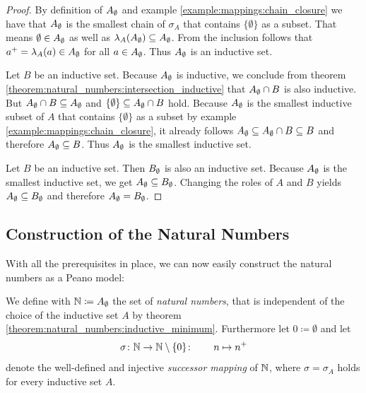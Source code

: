 \begin{proof}
     By definition of ${A}_\emptyset$ and example \ref{example:mappings:chain_closure} we have that ${A}_\emptyset$ is the smallest chain of $\sigma_A$ that contains $\{\emptyset\}$ as a subset. That means $\emptyset\in{A}_\emptyset$ as well as $\lambda_A({A}_\emptyset)\subseteq{A}_\emptyset$. From the inclusion follows that $a^+=\lambda_A(a)\in {A}_\emptyset$ for all $a\in {A}_\emptyset$. Thus ${A}_\emptyset$ is an inductive set.

     Let $B$ be an inductive set. Because ${A}_\emptyset$ is inductive, we conclude from theorem \ref{theorem:natural_numbers:intersection_inductive} that ${A}_\emptyset\cap B$ is also inductive. But ${A}_\emptyset\cap B\subseteq{A}_\emptyset$ and $\{\emptyset\}\subseteq{A}_\emptyset\cap B$ hold. Because ${A}_\emptyset$ is the smallest inductive subset of $A$ that contains $\{\emptyset\}$ as a subset by example \ref{example:mappings:chain_closure}, it already follows ${A}_\emptyset\subseteq {A}_\emptyset\cap B\subseteq B$ and therefore ${A}_\emptyset\subseteq B$. Thus ${A}_\emptyset$ is the smallest inductive set.

     Let $B$ be an inductive set. Then ${B}_\emptyset$ is also an inductive set. Because ${A}_\emptyset$ is the smallest inductive set, we get ${A}_\emptyset\subseteq {B}_\emptyset$. Changing the roles of $A$ and $B$ yields ${A}_\emptyset\subseteq {B}_\emptyset$ and therefore ${A}_\emptyset={B}_\emptyset$.
\end{proof}

\subsection{Construction of the Natural Numbers}

With all the prerequisites in place, we can now easily construct the natural numbers as a Peano model:

\begin{definition}\label{definition:natural_numbers:natural_numbers}
    We define with $\mathbb{N}\coloneq {A}_\emptyset$ the set of \emph{natural numbers}, that is independent of the choice of the inductive set $A$ by theorem \ref{theorem:natural_numbers:inductive_minimum}. Furthermore let $0\coloneq\emptyset$ and let
    \begin{align}\sigma\colon \mathbb{N}\rightarrow\mathbb{N}\setminus\{0\}\colon\qquad n\mapsto n^+\end{align}
    denote the well-defined and injective \emph{successor mapping} of $\mathbb{N}$, where $\sigma=\sigma_A$ holds for every inductive set $A$.
\end{definition}

